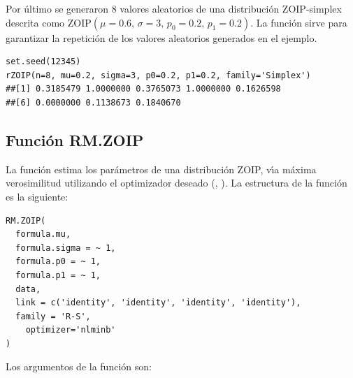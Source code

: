 Por \'{u}ltimo se generaron 8 valores aleatorios de una distribuci\'{o}n ZOIP-simplex descrita como $\text{ZOIP}(\mu=0.6, \, \sigma=3, \, p_0=0.2, \, p_1=0.2)$. La funci\'{o}n  sirve para garantizar la repetici\'{o}n de los valores aleatorios generados en el ejemplo.\\

\begin{verbatim}
set.seed(12345)
rZOIP(n=8, mu=0.2, sigma=3, p0=0.2, p1=0.2, family='Simplex')
##[1] 0.3185479 1.0000000 0.3765073 1.0000000 0.1626598
##[6] 0.0000000 0.1138673 0.1840670
\end{verbatim}

\subsection{Funci\'{o}n RM.ZOIP}

La funci\'{o}n  estima los par\'{a}metros de una distribuci\'{o}n ZOIP, v\'{\i}a m\'{a}xima verosimilitud utilizando el optimizador deseado (, ). La estructura de la funci\'{o}n  es la siguiente:

\begin{verbatim}
RM.ZOIP(
  formula.mu,
  formula.sigma = ~ 1,
  formula.p0 = ~ 1,
  formula.p1 = ~ 1,
  data,
  link = c('identity', 'identity', 'identity', 'identity'),
  family = 'R-S',
	optimizer='nlminb'
)
\end{verbatim}

Los argumentos de la funci\'{o}n  son:

